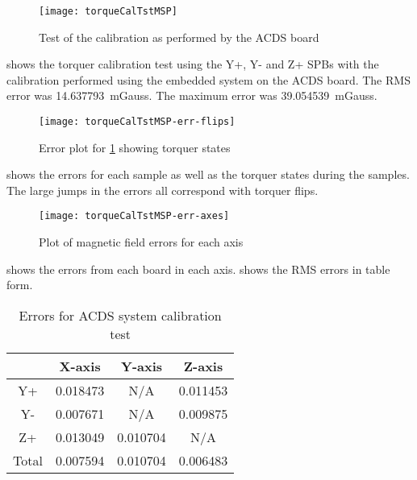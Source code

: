 \begin{figure}[!ht]
    \centering
    \texttt{[image: torqueCalTstMSP]}
    \caption{Test of the calibration as performed by the \ac{ACDS} board}
    \label{fig:tcalMSP}
\end{figure}

 shows the torquer calibration test using the Y+, Y- and Z+ \acp{SPB} with the calibration performed using the embedded system on the \ac{ACDS} board. The RMS error was 14.637793~mGauss. The maximum error was 39.054539~mGauss.

\begin{figure}[!ht]
    \centering
    \texttt{[image: torqueCalTstMSP-err-flips]}
    \caption{Error plot for \cref{fig:tcalMSP} showing torquer states}
    \label{fig:tcalMSPerr}
\end{figure}

 shows the errors for each sample as well as the torquer states during the samples. The large jumps in the errors all correspond with torquer flips.

\begin{figure}[!ht]
    \centering
    \texttt{[image: torqueCalTstMSP-err-axes]}
    \caption{Plot of magnetic field errors for each axis}
    \label{fig:tcalMSPerr-axis}
\end{figure}

 shows the errors from each board in each axis.  shows the RMS errors in table form.

\begin{table}[!ht]
    \centering
    \caption{Errors for \ac{ACDS} system calibration test}
    \label{tab:tcalMSPerr}
    \begin{tabular}{|c|c|c|c|}
        \hline
        &X-axis&Y-axis&Z-axis\\
        \hline
        Y+&0.018473&N/A&0.011453\\
        \hline
        Y-&0.007671&N/A&0.009875\\
        \hline
        Z+&0.013049&0.010704&N/A\\
        \hline
        Total&0.007594&0.010704&0.006483\\
        \hline
    \end{tabular}
\end{table}

\begin{comment}
X-axis errors:
    Y+ RMS error = 0.018473
    Y- RMS error = 0.007671
    Z+ RMS error = 0.013049
Total X-axis error = 0.007594

Y-axis errors:
    Z+ RMS error = 0.010704
Total Y-axis error = 0.010704

Z-axis errors:
    Y+ RMS error = 0.011453
    Y- RMS error = 0.009875
Total Z-axis error = 0.006483
\end{comment}

